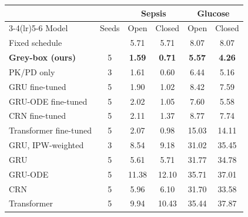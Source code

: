 \begin{tabular}{lccccc}
\toprule
 & & \multicolumn{2}{c}{Sepsis} & \multicolumn{2}{c}{Glucose} \\
\cmidrule(lr){3-4}\cmidrule(lr){5-6}
Model & Seeds & Open & Closed & Open & Closed \\
\midrule
Fixed schedule &  & 5.71 & 5.71 & 8.07 & 8.07 \\
\midrule
\textbf{Grey-box (ours)} & 5 & \textbf{1.59} & \textbf{0.71} & \textbf{5.57} & \textbf{4.26} \\
PK/PD only & 3 & 1.61 & 0.60 & 6.44 & 5.16 \\
GRU fine-tuned & 5 & 1.90 & 1.02 & 8.42 & 7.59 \\
GRU-ODE fine-tuned & 5 & 2.02 & 1.05 & 7.60 & 5.58 \\
CRN fine-tuned & 5 & 2.11 & 1.37 & 8.77 & 7.74 \\
Transformer fine-tuned & 5 & 2.07 & 0.98 & 15.03 & 14.11 \\
GRU, IPW-weighted & 3 & 8.54 & 9.18 & 31.02 & 35.45 \\
GRU & 5 & 5.61 & 5.71 & 31.77 & 34.78 \\
GRU-ODE & 5 & 11.38 & 12.10 & 35.71 & 37.01 \\
CRN & 5 & 5.96 & 6.10 & 31.70 & 33.58 \\
Transformer & 5 & 9.94 & 10.43 & 35.44 & 37.87 \\
\bottomrule
\end{tabular}
